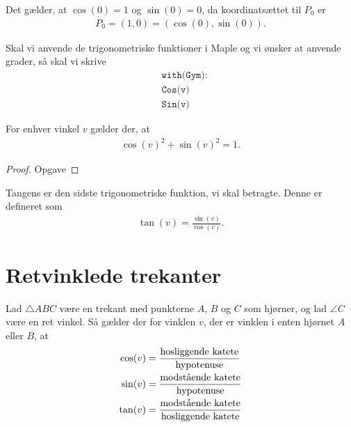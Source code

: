 \begin{exa}
Det gælder, at $\cos(0) = 1$ og $\sin(0)=0$, da koordinatsættet til $P_0$ er 
\begin{align*}
P_0 = (1,0) = (\cos(0),\sin(0)).
\end{align*}
\end{exa}

Skal vi anvende de trigonometriske funktioner i Maple og vi ønsker at anvende grader, så skal vi skrive
\begin{align*}
	&\texttt{with(Gym):} \\
	&\texttt{Cos(v)} \\	
	&\texttt{Sin(v)}
\end{align*}

\begin{setn}[Idiotformlen]
For enhver vinkel $v$ gælder der, at 
\begin{align*}
 \cos(v)^2 + \sin(v)^2 = 1.
\end{align*}
\end{setn}
\begin{proof}
Opgave
\end{proof}

Tangens er den sidste trigonometriske funktion, vi skal betragte. Denne er defineret som 
\begin{align*}
\tan(v) = \frac{\sin(v)}{\cos(v)}.
\end{align*}

\newpage

\section*{Retvinklede trekanter}

\begin{setn}
Lad $\triangle ABC$ være en trekant med punkterne $A$,  $B$ og $C$ som hjørner, og lad $\angle C$ være en ret vinkel. Så gælder der for vinklen $v$, der er vinklen i enten hjørnet $A$ eller $B$, at 
\begin{align*}
\cos(v) &= \frac{\textnormal{hosliggende katete}}{\textnormal{hypotenuse}}\\
\sin(v) &= \frac{\textnormal{modstående katete}}{\textnormal{hypotenuse}}\\
\tan(v) &= \frac{\textnormal{modstående katete}}{\textnormal{hosliggende katete}}
\end{align*}
\end{setn}

